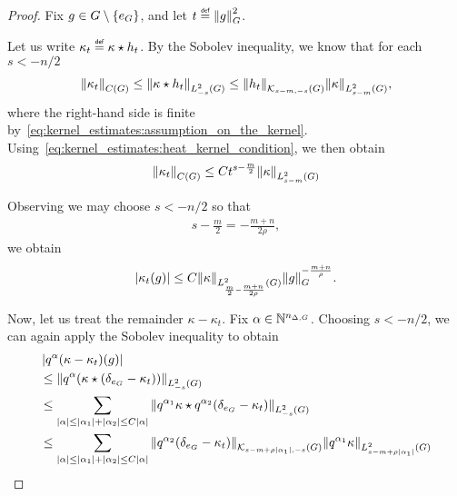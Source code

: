 \begin{proof}
    Fix $g \in \Group \setminus \{e_\Group\}$,
    and let $t \defeq \norm [\Group] g^2$.

    Let us write $\kappa_t \defeq \conv \kappa {h_t}$.
    By the Sobolev inequality,
    we know that for each $s < -n/2$
    \begin{align*}
        \norm [\ContinuousFunctions \Group] {\kappa_t}
        \leq \norm [\Sobolev {-s}] {\conv \kappa {h_t}}
        \leq \norm [\KernelsSobolev {s - m} {-s}] {h_t}
        \norm [\Sobolev {s - m}] \kappa,
    \end{align*}
    where the right-hand side is finite by~\eqref{eq:kernel_estimates:assumption_on_the_kernel}.
    Using~\eqref{eq:kernel_estimates:heat_kernel_condition},
    we then obtain
    \begin{align*}
        \norm [\ContinuousFunctions \Group] {\kappa_t}
        \leq C t^{s - \frac m 2} \norm [\Sobolev {s - m}] \kappa
    \end{align*}

    Observing we may choose $s < -n/2$ so that
    \begin{align*}
        s - \frac m 2 = -\frac {m + n} {2 \rho},
    \end{align*}
    we obtain
    \begin{align}
        \abs {\kappa_t(g)}
        \leq C \norm [\Sobolev {\frac m 2 -\frac {m + n} {2 \rho}}] \kappa \norm [\Group] g^{- \frac {m + n} \rho}.
        \label{eq:kernel_estimates:estimate_on_kappa_t}
    \end{align}

    Now, let us treat the remainder $\kappa - \kappa_t$.
    Fix $\alpha \in \N^{\dimDifferenceOperators}$.
    Choosing $s < -n/2$,
    we can again apply the Sobolev inequality to obtain
    \begin{align*}
        &\abs {q^\alpha (\kappa - \kappa_t)(g)}\\
        &\leq \norm [\Sobolev {-s}] {q^\alpha(\conv \kappa {(\delta_{e_\Group} - \kappa_t)})}\\
        &\leq \sum_{\abs \alpha \leq \abs {\alpha_1} + \abs {\alpha_2} \leq C \abs \alpha}
        \norm [\Sobolev {-s}] {\conv {q^{\alpha_1} \kappa} {q^{\alpha_2} (\delta_{e_\Group} - \kappa_t)}}\\
        &\leq \sum_{\abs \alpha \leq \abs {\alpha_1} + \abs {\alpha_2} \leq C \abs \alpha}
        \norm [\KernelsSobolev {s - m + \rho \abs {\alpha_1}} {-s}] {q^{\alpha_2}(\delta_{e_\Group} - \kappa_t)}
        \norm [\Sobolev {s - m + \rho \abs {\alpha_1}}] {q^{\alpha_1} \kappa}
    \end{align*}


\end{proof}
